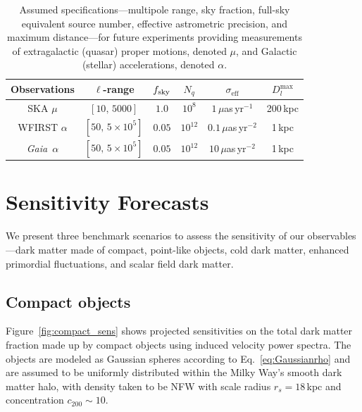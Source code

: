 \documentclass[prd,aps,10pt,nofootinbib,twocolumn,superscriptaddress,preprintnumbers,balancelastpage,longbibliography]{revtex4-1}
\newcommand{\Gaia}{\emph{Gaia}\xspace}
\begin{document}
\begin{table}[h]
\begin{center}
\begin{tabular}{c|ccccc}
\hline \hline
Observations & $\ell$-range & $f_{\rm sky}$ & $N_q$ & $\sigma_\mathrm{eff}$ & $D_l^\mathrm{max}$ \\ 
\hline \hline
SKA $\mu$ & $[10,\,5000]$ & $1.0$ & $10^8$ & $1\,\mu$as\,yr$^{-1}$ & 200\,kpc\\
\hline
WFIRST $\alpha$ & $[50,\,5\times10^5]$ &  $0.05$ &  $10^{12}$  & $0.1\,\mu$as\,yr$^{-2}$ & 1\,kpc   \\
\Gaia~$\alpha$ & $[50,\,5\times10^5]$ &  $0.05$ &  $10^{12}$  & $10\,\mu$as\,yr$^{-2}$ & 1\,kpc   \\
\hline
\end{tabular}
\end{center}
\caption{Assumed specifications---multipole range, sky fraction, full-sky equivalent source number, effective astrometric precision, and maximum distance---for future experiments providing measurements of extragalactic (quasar) proper motions, denoted $\mu$, and Galactic (stellar) accelerations, denoted $\alpha$.}
\label{tab:noise_specs}
\end{table}



\section{Sensitivity Forecasts}
\label{sec:forecasts}

We present three benchmark scenarios to assess the sensitivity of our observables---dark matter made of compact, point-like objects, cold dark matter, enhanced primordial fluctuations, and scalar field dark matter.

\subsection{Compact objects}
\label{sec:compact}

Figure~\ref{fig:compact_sens} shows projected sensitivities on the total dark matter fraction made up by compact objects using induced velocity power spectra. The objects are modeled as Gaussian spheres according to Eq.~\ref{eq:Gaussianrho} and are assumed to be uniformly distributed within the Milky Way's smooth dark matter halo, with density taken to be NFW with scale radius $r_s = 18$\,kpc and concentration $c_{200}\sim10$. 
\end{document}
